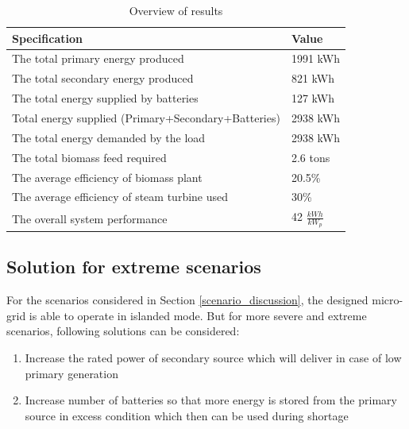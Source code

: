 \begin{table}[H]
\centering
\caption{Overview of results}
\begin{tabular}{|l|l|}
\hline
\textbf{Specification}                       & \textbf{Value} \\ \hline
The total primary energy produced            & 1991 kWh       \\ \hline
The total secondary energy produced          & 821 kWh        \\ \hline
The total energy supplied by batteries       & 127 kWh        \\ \hline
Total energy supplied (Primary+Secondary+Batteries)                       & 2938 kWh       \\ \hline
The total energy demanded by the load        & 2938 kWh       \\ \hline
The total biomass feed required              & 2.6 tons       \\ \hline
The average efficiency of biomass plant      & 20.5\%         \\ \hline
The average efficiency of steam turbine used & 30\%           \\ \hline
The overall system performance               & 42 $\frac{kWh}{kW_p}$     \\ \hline
\end{tabular}
\label{tab:overview_results}
\end{table}

\subsection{Solution for extreme scenarios}

\noindent For the scenarios considered in Section \ref{scenario_discussion}, the designed micro-grid is able to operate in islanded mode. But for more severe and extreme scenarios, following solutions can be considered:\\

\begin{enumerate}
    \item Increase the rated power of secondary source which will deliver in case of low primary generation
    \item Increase number of batteries so that more energy is stored from the primary source in excess condition which then can be used during shortage
\end{enumerate}






